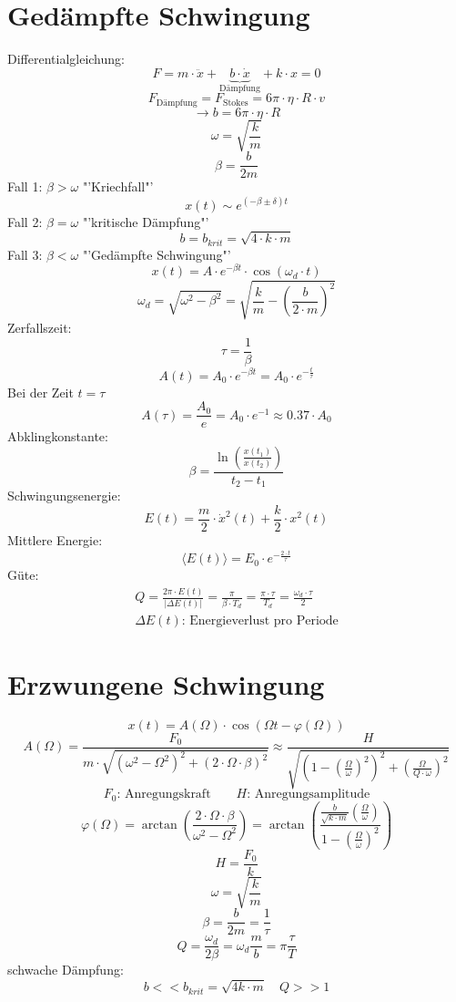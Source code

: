 \section{Gedämpfte Schwingung}
Differentialgleichung: 
\[ \boxed{F = m \cdot \ddot{x} + \underbrace{b \cdot \dot{x}}_
{\text{Dämpfung}} + k \cdot x = 0} \]
\[ \boxed{F_{\text{Dämpfung}} = F_{\text{Stokes}} 
= 6 \pi \cdot \eta \cdot R \cdot v} \]
\[ \boxed{\rightarrow b = 6 \pi \cdot \eta \cdot R} \]
\[ \boxed{\omega = \sqrt{\frac{k}{m}}} \]
\[ \boxed{\beta = \frac{b}{2 m}} \]
Fall 1: $\beta > \omega$ "'Kriechfall"'
\[ \boxed{x(t) \sim e^{(-\beta \pm \delta)t}} \]
Fall 2: $\beta = \omega$ "'kritische Dämpfung"'
\[ \boxed{b = b_{krit} = \sqrt{4 \cdot k \cdot m}} \]
Fall 3: $\beta < \omega$ "'Gedämpfte Schwingung"'
\[ \boxed{x(t) = A \cdot e^{-\beta t} \cdot \cos(\omega_d \cdot t)} \]
\[ \boxed{\omega_d = \sqrt{\omega^2 - \beta^2} 
= \sqrt{\frac{k}{m} - \left({\frac{b}{2 \cdot m}}\right)^2}} \]
Zerfallszeit: 
\[ \boxed{\tau = \frac{1}{\beta}} \]
\[ \boxed{A(t) = A_0 \cdot e^{-\beta t} = A_0 \cdot e^{-\frac{t}{\tau}}} \]
Bei der Zeit $t = \tau$
\[ \boxed{A(\tau) = \frac{A_0}{e} = A_0 \cdot e^{-1} \approx 0.37 \cdot A_0} \]
Abklingkonstante: 
\[ \boxed{\beta 
= \frac{\ln\left(\frac{x(t_1)}{x(t_2)}\right)}{t_2 - t_1}} \]
Schwingungsenergie: 
\[ \boxed{E(t) = \frac{m}{2} \cdot \dot{x}^2(t) + \frac{k}{2} \cdot x^2(t)} \]
Mittlere Energie: 
\[ \boxed{\langle E(t)\rangle = E_0 \cdot e^{-\frac{2 \cdot t}{\tau}}} \]
Güte: 
\[ \begin{array}{l}
\boxed{Q = \frac{2 \pi \cdot E(t)}{|\Delta E(t)|} 
= \frac{\pi}{\beta \cdot T_d} = \frac{\pi \cdot \tau}{T_d} 
= \frac{\omega_d \cdot \tau}{2}} \\
\text{$\Delta E(t)$: Energieverlust pro Periode}
\end{array} \]

\section{Erzwungene Schwingung}
\[ \boxed{x(t) = A(\Omega) \cdot \cos(\Omega t - \varphi(\Omega))} \]
\[ \boxed{A(\Omega) = \frac{F_0}{m \cdot 
\sqrt{(\omega^2 - \Omega^2)^2 + (2 \cdot \Omega \cdot \beta)^2}} 
\approx \frac{H}{\sqrt{\left(1 - \left(\frac{\Omega}{\omega}\right)^2\right)^2 
+ \left(\frac{\Omega}{Q \cdot \omega}\right)^2}}} \]  
\[ F_0\text{: Anregungskraft} \qquad H\text{: Anregungsamplitude} \]
\[ \boxed{\varphi(\Omega) = \arctan\left(\frac{2 \cdot \Omega \cdot \beta}
{{\omega}^2 - \Omega^2}\right) 
= \arctan{\left(\frac{\frac{b}{\sqrt{k \cdot m}} 
\left(\frac{\Omega}{\omega}\right)}
{1 - \left(\frac{\Omega}{\omega}\right)^2}\right)}} \]
\[ \boxed{H = \frac{F_0}{k}} \]
\[ \boxed{\omega = \sqrt{\frac{k}{m}}} \]
\[ \boxed{\beta = \frac{b}{2 m} = \frac{1}{\tau}} \]
\[ \boxed{Q = \frac{\omega_d}{2\beta} = \omega_d \frac{m}{b} 
= \pi \frac{\tau}{T}} \]
schwache Dämpfung: 
\[ \boxed{b << b_{krit} = \sqrt{4 k \cdot m} \quad Q >> 1} \]

